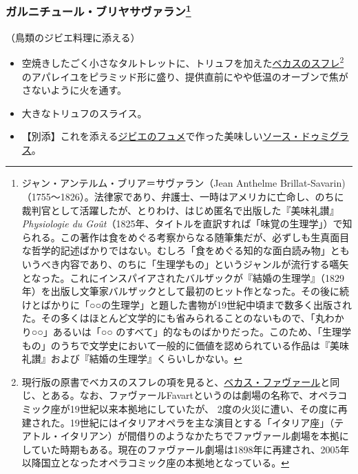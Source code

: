 \begin{recette}
\hypertarget{garniture-brillat-savarin}{%
\subsubsection[ガルニチュール・ブリヤサヴァラン]{\texorpdfstring{ガルニチュール・ブリヤサヴァラン\footnote{ジャン・アンテルム・ブリア＝サヴァラン（Jean
  Anthelme
  Brillat-Savarin)（1755〜1826）。法律家であり、弁護士、一時はアメリカに亡命し、のちに裁判官として活躍したが、とりわけ、はじめ匿名で出版した『美味礼讃』\emph{Physiologie
  du
  Goût}（1825年、タイトルを直訳すれば「味覚の生理学」）で知られる。この著作は食をめぐる考察からなる随筆集だが、必ずしも生真面目な哲学的記述ばかりではない。むしろ「食をめぐる知的な面白読み物」ともいうべき内容であり、のちに「生理学もの」というジャンルが流行する嚆矢となった。これにインスパイアされたバルザックが『結婚の生理学』（1829年）を出版し文筆家バルザックとして最初のヒット作となった。その後に続けとばかりに「○○の生理学」と題した書物が19世紀中頃まで数多く出版された。その多くはほとんど文学的にも省みられることのないもので、「丸わかり○○」あるいは「○○
  のすべて」的なものばかりだった。このため、「生理学もの」のうちで文学史において一般的に価値を認められている作品は『美味礼讃』および『結婚の生理学』くらいしかない。}}{ガルニチュール・ブリヤサヴァラン}}\label{garniture-brillat-savarin}}



（鳥類のジビエ料理に添える）

\begin{itemize}
\item
  空焼きしたごく小さなタルトレットに、トリュフを加えた\protect\hyperlink{souffle-de-becasse}{ベカスのスフレ}\footnote{現行版の原書でベカスのスフレの項を見ると、\protect\hyperlink{becasse-favart}{ベカス・ファヴァール}と同じ、とある。なお、ファヴァールFavartというのは劇場の名称で、オペラコミック座が19世紀以来本拠地にしていたが、
    2度の火災に遭い、その度に再建された。19世紀にはイタリアオペラを主な演目とする「イタリア座」（テアトル・イタリアン）が間借りのようなかたちでファヴァール劇場を本拠にしていた時期もある。現在のファヴァール劇場は1898年に再建され、2005年以降国立となったオペラコミック座の本拠地となっている。}
  のアパレイユをピラミッド形に盛り、提供直前にやや低温のオーブンで焦がさないように火を通す。
\item
  大きなトリュフのスライス。
\item
  【別添】これを添える\protect\hyperlink{fonds-de-gibier}{ジビエのフュメ}で作った美味しい\protect\hyperlink{sauce-demi-glace}{ソース・ドゥミグラス}。
\end{itemize}


\end{recette}
